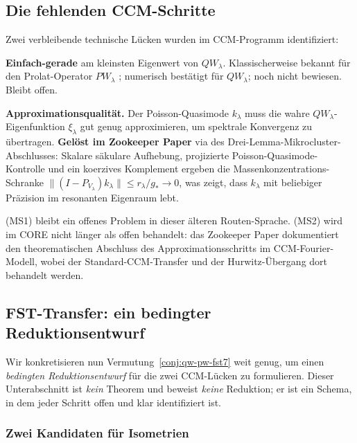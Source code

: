 \documentclass[11pt,a4paper]{article}
\theoremstyle{plain}
\theoremstyle{definition}
\begin{document}
\subsection{Die fehlenden CCM-Schritte}
\label{sec:ccm-missing-steps}

Zwei verbleibende technische Lücken wurden im CCM-Programm identifiziert:
\begin{description}[leftmargin=*,style=nextline]
\item[(MS1)] \textbf{Einfach-gerade} am kleinsten Eigenwert von $QW_\lambda$.
  Klassischerweise bekannt für den Prolat-Operator $PW_\lambda$ \cite{SlepianPollack1961};
  numerisch bestätigt für $QW_\lambda$; noch nicht bewiesen. Bleibt offen.
\item[(MS2)] \textbf{Approximationsqualität.} Der Poisson-Quasimode
  $k_\lambda$ muss die wahre $QW_\lambda$-Eigenfunktion $\xi_\lambda$
  gut genug approximieren, um spektrale Konvergenz zu übertragen.
  \textbf{Gelöst im Zookeeper Paper} via des Drei-Lemma-Mikrocluster-Abschlusses:
  Skalare säkulare Aufhebung, projizierte Poisson-Quasimode-Kontrolle
  und ein koerzives Komplement ergeben die Massenkonzentrations-Schranke
  $\|(I-P_{V_\lambda})k_\lambda\| \leq r_\lambda/g_* \to 0$,
  was zeigt, dass $k_\lambda$ mit beliebiger Präzision im resonanten Eigenraum lebt.
\end{description}

(MS1) bleibt ein offenes Problem in dieser älteren Routen-Sprache. (MS2)
wird im CORE nicht länger als offen behandelt: das Zookeeper Paper dokumentiert
den theorematischen Abschluss des Approximationsschritts im CCM-Fourier-Modell,
wobei der Standard-CCM-Transfer und der Hurwitz-Übergang dort behandelt werden.

\subsection{FST-Transfer: ein bedingter Reduktionsentwurf}
\label{sec:fst-transfer}

Wir konkretisieren nun Vermutung~\ref{conj:qw-pw-fst7} weit genug, um
einen \emph{bedingten Reduktionsentwurf} für die zwei CCM-Lücken zu formulieren.
Dieser Unterabschnitt ist \emph{kein} Theorem und beweist \emph{keine} Reduktion;
er ist ein Schema, in dem jeder Schritt offen und klar identifiziert ist.

\subsubsection{Zwei Kandidaten für Isometrien}
\end{document}
